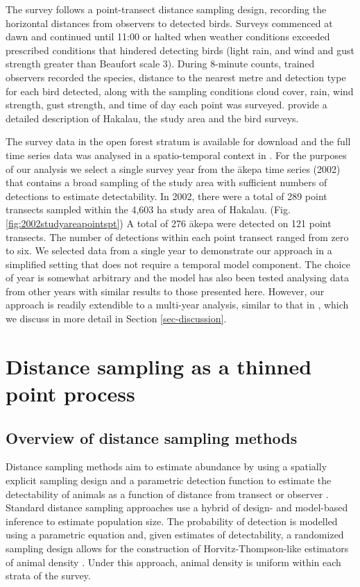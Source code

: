 \documentclass{stylefile16/statsoc}
\newcommand{\akepa}{\textquotesingle\={a}kepa}  %
\begin{document}
The survey follows a point-transect distance sampling design, recording the horizontal distances from observers to detected birds. Surveys commenced at dawn and continued until 11:00 or halted when weather conditions exceeded prescribed conditions that hindered detecting birds (light rain, and wind and gust strength greater than Beaufort scale 3). During 8-minute counts, trained observers recorded the species, distance to the nearest metre and detection type for each bird detected, along with the sampling conditions cloud cover, rain, wind strength, gust strength, and time of day each point was surveyed.  \cite{camp_population_2010,camp_statespace_2016} provide a detailed description of Hakalau, the study area and the bird surveys.

The survey data in the open forest stratum is available for download \citep{camp_datarelease_2002} and the full time series data was analysed in a spatio-temporal context in \citep{camp_dsm_2020}.  For the purposes of our analysis we select a single survey year from the \akepa{} time series (2002) that contains a broad sampling of the study area with sufficient numbers of detections to estimate detectability. In 2002, there were a total of 289 point transects sampled within the 4,603 ha study area of Hakalau. (Fig. \ref{fig:2002studyareapointspt}) A total of 276 \akepa{} were detected on 121 point transects. The number of detections within each point transect ranged from zero to six. We selected data from a single year to demonstrate our approach in a simplified setting that does not require a temporal model component.  The choice of year is somewhat arbitrary and the model has also been tested analysing data from other years with similar results to those presented here.  However, our approach is readily extendible to a multi-year analysis, similar to that in \cite{camp_dsm_2020}, which we discuss in more detail in Section \ref{sec-discussion}.

\vfill

\section{Distance sampling as a thinned point process}
\label{sec-ds-pp}

\subsection{Overview of distance sampling methods}

Distance sampling methods aim to estimate abundance by using a spatially explicit sampling design and a parametric detection function to estimate the detectability of animals as a function of distance from transect or observer \citep{buckland_advanced_2004, buckland_distance_2015}.  Standard distance sampling approaches use a hybrid of design- and model-based inference to estimate population size.  The probability of detection is modelled using a parametric equation and, given estimates of detectability, a randomized sampling design allows for the construction of Horvitz-Thompson-like estimators of animal density \citep{ buckland_advanced_2004, horvitz_generalization_1952}.  Under this approach, animal density is uniform within each strata of the survey.  
\end{document}
